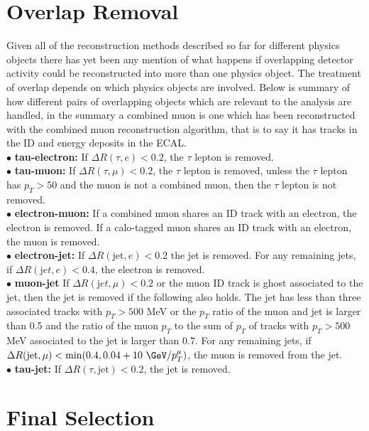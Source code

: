 \section{Overlap Removal}
Given all of the reconstruction methods described so far for different physics
objects there has yet been any mention of what happens if overlapping detector
activity could be reconstructed into more than one physics object. The treatment
of overlap depends on which physics objects are involved. Below is summary of
how different pairs of overlapping objects which are relevant to the analysis
are handled, in the summary a combined muon is one which has been reconstructed
with the combined muon reconstruction algorithm, that is to say it has tracks in
the ID and energy deposits in the ECAL.\\
$\bullet$ \textbf{tau-electron:} If $\Delta R(\tau,e)<0.2$, the $\tau$ lepton is
removed.\\
%
$\bullet$ \textbf{tau-muon:} If $\Delta R(\tau,\mu)<0.2$, the $\tau$ lepton is
removed, unless the $\tau$ lepton has $p_T>50$ \GeV and the muon is not a combined
muon, then the $\tau$ lepton is not removed.\\
%
$\bullet$ \textbf{electron-muon:} If a combined muon shares an ID track with an
electron, the electron is removed. If a calo-tagged muon shares an ID track with
an electron, the muon is removed.\\
%
$\bullet$ \textbf{electron-jet:} If $\Delta R(\mathrm{jet},e)<0.2$ the jet is
removed. For any remaining jets, if $\Delta R({\mathrm jet},e)<0.4$, the
electron is removed.\\
%
$\bullet$ \textbf{muon-jet} If $\Delta R({\mathrm jet},\mu)<0.2$ or the muon ID
track is ghost associated to the jet, then the jet is removed if the following
also holds. The jet has less than three associated tracks with $p_T > 500$ MeV
or the $p_T$ ratio of the muon and jet is larger than 0.5 and the ratio of the
muon $p_T$ to the sum of $p_T$ of tracks with $p_T > 500$ MeV associated to the
jet is larger than 0.7. For any remaining jets, if $\Delta
R(\mathrm{jet},\mu)<\min(0.4, 0.04 + 10\ \mathrm{\GeV} / p_T^{\mu})$, the muon is
removed from the jet.\\
%
$\bullet$ \textbf{tau-jet:} If $\Delta R(\tau,\mathrm{jet})<0.2$, the jet is
removed.


\section{Final Selection}
\label{sec:selection}

